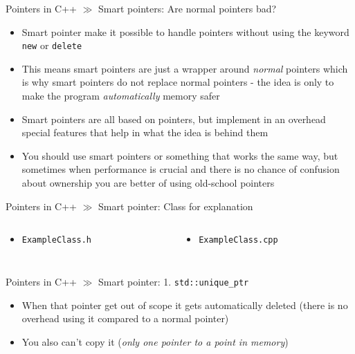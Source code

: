 \documentclass[10pt]{beamer}
\begin{document}
\begin{frame}{Pointers in C++ $\gg$ Smart pointers: Are normal pointers bad?}
\begin{itemize}
	\item Smart pointer make it possible to handle pointers without using the keyword \texttt{new} or \texttt{delete}
	\item This means smart pointers are just a wrapper around \textit{normal} pointers which is why smart pointers do not replace normal pointers - the idea is only to make the program \textit{automatically} memory safer
	\item Smart pointers are all based on pointers, but implement in an overhead special features that help in what the idea is behind them
	\item You should use smart pointers or something that works the same way, but sometimes when performance is crucial and there is no chance of confusion about ownership you are better of using old-school pointers
\end{itemize}
\end{frame}

\begin{frame}{Pointers in C++ $\gg$ Smart pointer: Class for explanation}
\begin{columns}
	\begin{column}{0.375\textwidth}
		\begin{itemize}
			\item \texttt{ExampleClass.h}
			\inputminted[bgcolor=lightGreyCustom,fontsize=\scriptsize]{cpp}{./resources/ExampleClass.h}
		\end{itemize}
	\end{column}
	\begin{column}{0.65\textwidth}
		\begin{itemize}
			\item \texttt{ExampleClass.cpp}
			\inputminted[bgcolor=lightGreyCustom,fontsize=\scriptsize]{cpp}{./resources/ExampleClass.cpp}
		\end{itemize}
	\end{column}
\end{columns}
\end{frame}


\begin{frame}{Pointers in C++ $\gg$ Smart pointer: 1.  \texttt{std::unique_ptr}}
\begin{itemize}
	\item When that pointer get out of scope it gets automatically deleted (there is no overhead using it compared to a normal pointer)
	\item You also can't copy it (\textit{only one pointer to a point in memory})
	\inputminted[bgcolor=lightGreyCustom,fontsize=\scriptsize]{cpp}{./resources/unique_ptr.cpp}
	\vspace{-9mm}
	\inputminted[bgcolor=lightGreyCustom,fontsize=\scriptsize]{sh}{./resources/build_unique_ptr.sh}
\end{itemize}
\end{frame}
\end{document}
